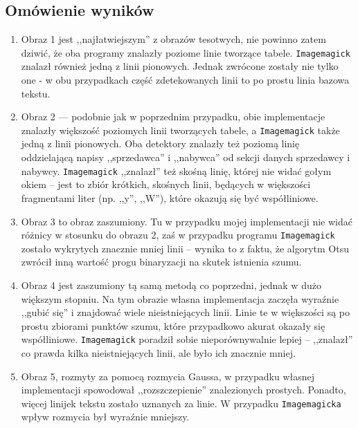 \documentclass[10pt]{article} %
\begin{document}
\subsection{Omówienie wyników}
\begin{enumerate}
\item Obraz 1 jest ,,najłatwiejszym'' z obrazów tesotwych, nie powinno zatem dziwić, że oba programy znalazły poziome linie tworzące tabele. \texttt{Imagemagick} znalazł również jedną z linii pionowych. Jednak zwrócone zostały nie tylko one - w obu przypadkach część zdetekowanych linii to po prostu linia bazowa tekstu.
\item Obraz 2 --- podobnie jak w poprzednim przypadku, obie implementacje znalazły większość poziomych linii tworzących tabele, a \texttt{Imagemagick} także jedną z linii pionowych. Oba detektory znalazły też poziomą linię oddzielającą napisy ,,sprzedawca'' i ,,nabywca'' od sekcji danych sprzedawcy i nabywcy. \texttt{Imagemagick} ,,znalazł'' też skośną linię, której nie widać gołym okiem -- jest to zbiór krótkich, skośnych linii, będących w większości fragmentami liter (np. ,,y'', ,,W''), które okazują się być współliniowe.
\item Obraz 3 to obraz zaszumiony. Tu w przypadku mojej implementacji nie widać różnicy w stosunku do obrazu 2, zaś w przypadku programu \texttt{Imagemagick} zostało wykrytych znacznie mniej linii -- wynika to z faktu, że algorytm Otsu zwrócił inną wartość progu binaryzacji na skutek istnienia szumu.
\item Obraz 4 jest zaszumiony tą samą metodą co poprzedni, jednak w dużo większym stopniu. Na tym obrazie własna implementacja zaczęła wyraźnie ,,gubić się'' i znajdować wiele nieistniejących linii. Linie te w większości są po prostu zbiorami punktów szumu, które przypadkowo akurat okazały się współliniowe. \texttt{Imagemagick} poradził sobie nieporównywalnie lepiej -- ,,znalazł'' co prawda kilka nieistniejących linii, ale było ich znacznie mniej.
\item Obraz 5, rozmyty za pomocą rozmycia Gaussa, w przypadku własnej implementacji spowodował ,,rozszczepienie'' znalezionych prostych. Ponadto, więcej linijek tekstu zostało uznanych za linie. W przypadku  \texttt{Imagemagicka} wpływ rozmycia był wyraźnie mniejszy.
\end{enumerate}
\end{document}
